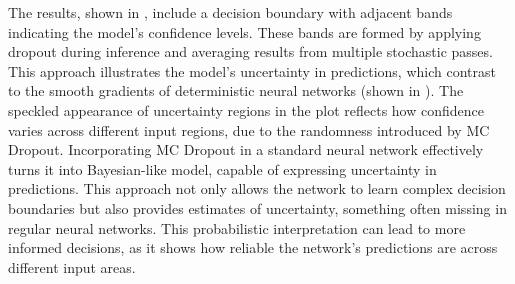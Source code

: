 The results, shown in , include a decision boundary with adjacent bands indicating the model's confidence levels. These bands are formed by applying dropout during inference and averaging results from multiple stochastic passes. This approach illustrates the model's uncertainty in predictions, which contrast to the smooth gradients of deterministic neural networks (shown in ). The speckled appearance of uncertainty regions in the plot reflects how confidence varies across different input regions, due to the randomness introduced by MC Dropout. Incorporating MC Dropout in a standard neural network effectively turns it into Bayesian-like model, capable of expressing uncertainty in predictions. This approach not only allows the network to learn complex decision boundaries but also provides estimates of uncertainty, something often missing in regular neural networks. This probabilistic interpretation can lead to more informed decisions, as it shows how reliable the network's predictions are across different input areas.


